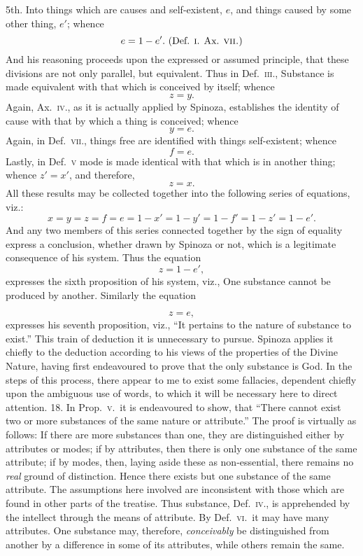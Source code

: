 \documentclass[oneside]{book}
\begin{document}
5th. Into things which are causes and self-existent, $e$, and
things caused by some other thing, $e'$; whence
\[
  e = 1 - e'. \textrm{ (Def. \textsc{i}. Ax. \textsc{vii.})}
\]
And his reasoning proceeds upon the expressed or assumed
principle, that these divisions are not only parallel, but equivalent. Thus in Def.~\textsc{iii.}, Substance is made equivalent with that
which is conceived by itself; whence
\[
  z = y .
\]
Again, Ax.~\textsc{iv}., as it is actually applied by Spinoza, establishes the identity of cause with that by which a thing is conceived; whence
\[
y = e.
\]
Again, in Def.~\textsc{vii}., things free are identified with things
self-existent; whence
\[
  f = e.
\]
Lastly, in Def.~\textsc{v} mode is made identical with that which is
in another thing; whence $z' = x'$, and therefore,
\[
  z=x.
\]
All these results may be collected together into the following
series of equations, viz.:
\[
x = y = z = f= e = 1-x' = 1-y' = 1-f'= 1-z' = 1-e'.
\]
And any two members of this series connected together by the
sign of equality express a conclusion, whether drawn by Spinoza
or not, which is a legitimate consequence of his system. Thus
the equation
\[
z=1-e',
\]
expresses the sixth proposition of his system, viz., One substance
cannot be produced by another. Similarly the equation

\[
z = e,
\]
expresses his seventh proposition, viz., ``It pertains to the nature
of substance to exist.'' This train of deduction it is unnecessary
to pursue. Spinoza applies it chiefly to the deduction according
to his views of the properties of the Divine Nature, having first
endeavoured to prove that the only substance is God. In the
steps of this process, there appear to me to exist some fallacies,
dependent chiefly upon the ambiguous use of words, to which it
will be necessary here to direct attention.
18. In Prop.~\textsc{v}.\ it is endeavoured to show, that ``There cannot
exist two or more substances of the same nature or attribute.''
The proof is virtually as follows: If there are more substances
than one, they are distinguished either by attributes or modes;
if by attributes, then there is only one substance of the same attribute;
if by modes, then, laying aside these as non-essential,
there remains no \emph{real} ground of distinction. Hence there exists
but one substance of the same attribute. The assumptions here
involved are inconsistent with those which are found in other
parts of the treatise. Thus substance, Def.~\textsc{iv}., is apprehended
by the intellect through the means of attribute. By Def.~\textsc{vi}.\ it
may have many attributes. One substance may, therefore, \emph{conceivably}
be distinguished from another by a difference in some of
its attributes, while others remain the same.
\end{document}
